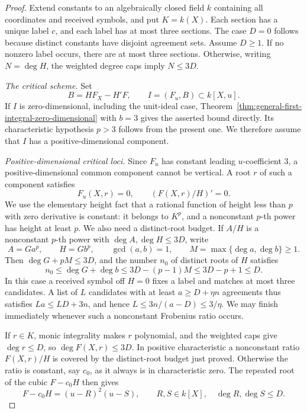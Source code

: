 \begin{proof}
Extend constants to an algebraically closed field $k$ containing all
coordinates and received symbols, and put $K=k(X)$.  Each section
has a unique label $c$, and each label has at most three sections.
The case $D=0$ follows because distinct constants have disjoint agreement
sets.  Assume $D\ge1$.  If no nonzero label occurs, there are at most
three sections.  Otherwise, writing $N=\deg H$, the weighted degree
caps imply $N\le3D$.

\emph{The critical scheme.}
Set
\[
 B=HF_X-H'F,\qquad I=(F_u,B)\subset k[X,u].
\]
If $I$ is zero-dimensional, including the unit-ideal case,
Theorem~\ref{thm:general-first-integral-zero-dimensional} with $b=3$
gives the asserted bound directly. Its characteristic hypothesis
$p>3$ follows from the present one. We therefore assume that $I$
has a positive-dimensional component.

\emph{Positive-dimensional critical loci.}
Since $F_u$ has constant leading
$u$-coefficient $3$, a positive-dimensional common component cannot be
vertical.  A root $r$ of such a component satisfies
\[
 F_u(X,r)=0,\qquad (F(X,r)/H)'=0.
\]
We use the elementary height fact that a rational function of height
less than $p$ with zero derivative is constant: it belongs to $K^p$,
and a nonconstant $p$-th power has height at least $p$.
We also need a distinct-root budget.  If $A/H$ is a nonconstant
$p$-th power with $\deg A,\deg H\le3D$, write
\[
 A=G a^p,\qquad H=G b^p,\qquad \gcd(a,b)=1,
 \qquad M=\max\{\deg a,\deg b\}\ge1.
\]
Then $\deg G+pM\le3D$, and the number $n_0$ of distinct roots of $H$
satisfies
\[
 n_0\le\deg G+\deg b\le3D-(p-1)M\le3D-p+1\le D.
\]
In this case a received symbol off $H=0$ fixes a label and matches
at most three candidates.  A list of $L$ candidates with at least
$a\ge D+\eta n$ agreements thus satisfies $La\le LD+3n$, and hence
$L\le3n/(a-D)\le3/\eta$.  We may finish immediately whenever
such a nonconstant Frobenius ratio occurs.

If $r\in K$, monic integrality makes $r$ polynomial, and the weighted
caps give $\deg r\le D$, so $\deg F(X,r)\le3D$.  In positive
characteristic a nonconstant ratio $F(X,r)/H$ is covered by the
distinct-root budget just proved.  Otherwise the ratio is constant,
say $c_0$, as it always is in characteristic zero.
The repeated root of the cubic $F-c_0H$ then gives
\begin{equation}\label{eq:cubic-repeated-fiber}
 F-c_0H=(u-R)^2(u-S),\qquad R,S\in k[X],\quad
 \deg R,\deg S\le D.
\end{equation}


\end{proof}
